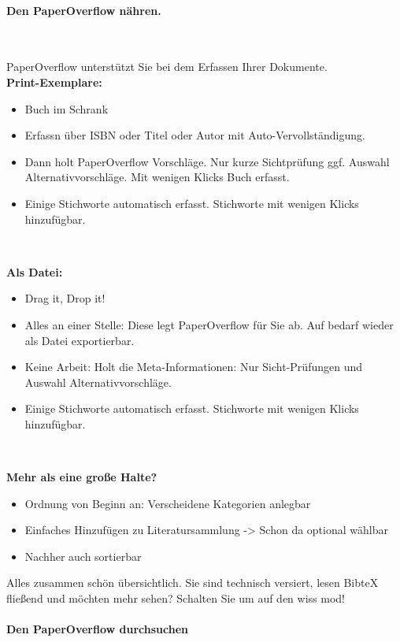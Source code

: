 \documentclass[a4paper,12pt]{article}
\begin{document}
\paragraph{Den PaperOverflow nähren.}\

PaperOverflow unterstützt Sie bei dem Erfassen Ihrer Dokumente. \\

\textbf{Print-Exemplare:}
\begin{itemize}
	\item Buch im Schrank
	\item Erfassn über ISBN oder Titel oder Autor mit Auto-Vervollständigung.
	\item Dann holt PaperOverflow Vorschläge. Nur kurze Sichtprüfung ggf. Auswahl Alternativvorschläge. Mit wenigen Klicks Buch erfasst.
	\item Einige Stichworte automatisch erfasst. Stichworte mit wenigen Klicks hinzufügbar.
\end{itemize} \

\textbf{Als Datei:}
\begin{itemize}
	\item Drag it, Drop it!
	\item Alles an einer Stelle: Diese legt PaperOverflow für Sie ab. Auf bedarf wieder als Datei exportierbar.
	\item Keine Arbeit: Holt die Meta-Informationen: Nur Sicht-Prüfungen und Auswahl Alternativvorschläge.
	\item Einige Stichworte automatisch erfasst. Stichworte mit wenigen Klicks hinzufügbar.
\end{itemize}\ 

\textbf{Mehr als eine große Halte?}
\begin{itemize}
	\item Ordnung von Beginn an: Verscheidene Kategorien anlegbar 
	\item Einfaches Hinzufügen zu Literatursammlung -> Schon da optional wählbar
	\item Nachher auch sortierbar
\end{itemize}

Alles zusammen schön übersichtlich.
Sie sind technisch versiert, lesen BibteX fließend und möchten mehr sehen? Schalten Sie um auf den wiss mod!
\\
\paragraph{Den PaperOverflow durchsuchen}\
\end{document}
